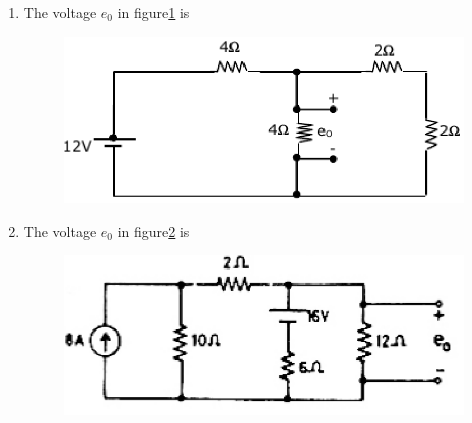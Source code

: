 \documentclass[journal,12pt,twocolumn]{IEEEtran}
\begin{document}
\begin{enumerate}
\item The voltage $e_{0}$ in figure\ref{fig36} is
\begin{enumerate}
\setlength\itemsep{2em}
\begin{figure}[!h]
\begin{center}
\includegraphics[scale=0.5]{./figs/fig36.eps}
\caption{}
\label{fig36}
\end{center}
\end{figure}
\end{enumerate}

\item The voltage $e_{0}$ in figure\ref{fig37} is
\begin{enumerate}
\setlength\itemsep{2em}
\begin{figure}[!h]
\begin{center}
\includegraphics[scale=0.5]{./figs/fig37.eps}
\caption{}
\label{fig37}
\end{center}
\end{figure}
\end{enumerate}


\end{enumerate}
\end{document}
